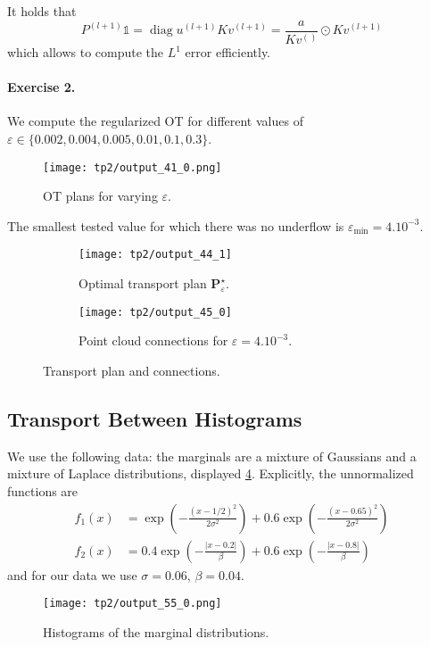 \documentclass{article}
\newcommand{\bfP}{\mathbf{P}}
\renewcommand{\epsilon}{\varepsilon}
\DeclareMathOperator{\diag}{diag}
\numberwithin{equation}{section}
\theoremstyle{definition}
\begin{document}
It holds that
\[
	P^{(l+1)}\mathds{1} = \diag{u^{(l+1)}}Kv^{(l+1)}
	= \frac{a}{Kv^{()}}\odot Kv^{(l+1)}
\]
which allows to compute the $L^1$ error efficiently.

\paragraph{Exercise 2.} We compute the regularized OT for different values of $\epsilon \in \{0.002, 0.004, 0.005, 0.01, 0.1, 0.3\}$.
\begin{figure}[!h]
	\texttt{[image: tp2/output\_41\_0.png]}\caption{OT plans for varying $\epsilon$.}
\end{figure}
The smallest tested value for which there was no underflow is $\epsilon_{\min} = 4.10^{-3}$.
\begin{figure}[!h]
	\begin{subfigure}{.49\linewidth}
		\centering
		\texttt{[image: tp2/output\_44\_1]}
		\caption{Optimal transport plan $\bfP^\star_\epsilon$.}
		\label{fig:output441}
	\end{subfigure}
	\begin{subfigure}{.49\linewidth}
		\centering
		\texttt{[image: tp2/output\_45\_0]}
		\caption{Point cloud connections for $\epsilon = 4.10^{-3}$.}
		\label{fig:output450}
	\end{subfigure}
	\caption{Transport plan and connections.}
\end{figure}


\subsection{Transport Between Histograms}

We use the following data: the marginals are a mixture of Gaussians and a mixture of Laplace distributions, displayed \cref{fig:tp2output550}. Explicitly, the unnormalized functions are
\begin{equation}
\begin{aligned}
	f_1(x) &= \exp\left(-\frac{(x-1/2)^2}{2\sigma^2}\right) + 0.6\exp\left(-\frac{(x-0.65)^2}{2\sigma^2}\right)  \\
	f_2(x) &= 0.4 \exp\left(-\frac{|x-0.2|}\beta\right) + 0.6\exp\left(-\frac{|x-0.8|}\beta\right)
\end{aligned}
\end{equation}
and for our data we use $\sigma = 0.06$, $\beta = 0.04$.


\begin{figure}[!h]
	\centering
	\texttt{[image: tp2/output\_55\_0.png]}\caption{Histograms of the marginal distributions.}\label{fig:tp2output550}
\end{figure}
\end{document}
